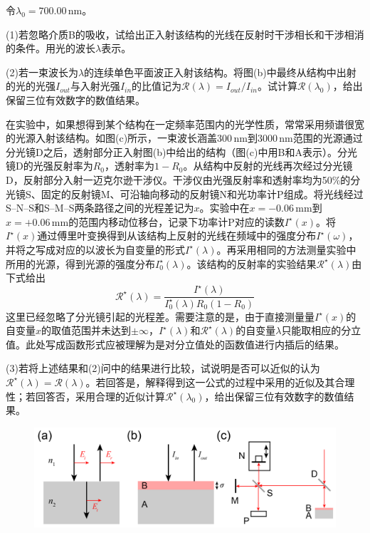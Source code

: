 \documentclass[11pt,a4paper,onecolumn,UTF8]{ctexart}
\begin{document}
	令$\lambda_0=700.00\,\text{nm}$。
	
	(1)若忽略介质B的吸收，试给出正入射该结构的光线在反射时干涉相长和干涉相消的条件。用光的波长$\lambda$表示。
	
	(2)若一束波长为$\lambda$的连续单色平面波正入射该结构。将图(b)中最终从结构中出射的光的光强$I_{out}$与入射光强$I_{in}$的比值记为$\mathscr{R}(\lambda)=I_{out}/I_{in}$。试计算$\mathscr{R}(\lambda_0)$，给出保留三位有效数字的数值结果。
	
	在实验中，如果想得到某个结构在一定频率范围内的光学性质，常常采用频谱很宽的光源入射该结构。如图(c)所示，一束波长涵盖$300\,\text{nm}$到$3000\,\text{nm}$范围的光源通过分光镜D之后，透射部分正入射图(b)中给出的结构（图(c)中用B和A表示）。分光镜D的光强反射率为$R_0$，透射率为$1-R_0$。从结构中反射的光线再次经过分光镜D，反射部分入射一迈克尔逊干涉仪。干涉仪由光强反射率和透射率均为50\%的分光镜S、固定的反射镜M、可沿轴向移动的反射镜N和光功率计P组成。将光线经过S--N--S和S--M--S两条路径之间的光程差记为$x$。实验中在$x=-0.06\,\text{mm}$到$x=+0.06\,\text{mm}$的范围内移动位移台，记录下功率计P对应的读数$I^{\star}(x)$。将$I^{\star}(x)$通过傅里叶变换得到从该结构上反射的光线在频域中的强度分布$I^{\star}(\omega)$，并将之写成对应的以波长为自变量的形式$I^{\star}(\lambda)$。再采用相同的方法测量实验中所用的光源，得到光源的强度分布$I_0^{\star}(\lambda)$。该结构的反射率的实验结果$\mathscr{R}^{\star}(\lambda)$由下式给出
	\begin{equation*}
		\mathscr{R}^{\star}(\lambda)=\frac{I^{\star}(\lambda)}{I_0^{\star}(\lambda)R_0(1-R_0)}
	\end{equation*}
	这里已经忽略了分光镜引起的光程差。需要注意的是，由于直接测量量$I^{\star}(x)$的自变量$x$的取值范围并未达到$\pm\infty$，$I^{\star}(\lambda)$和$\mathscr{R}^{\star}(\lambda)$的自变量$\lambda$只能取相应的分立值。此处写成函数形式应被理解为是对分立值处的函数值进行内插后的结果。
	
	(3)若将上述结果和(2)问中的结果进行比较，试说明是否可以近似的认为$\mathscr{R}^{\star}(\lambda)=\mathscr{R}(\lambda)$。若回答是，解释得到这一公式的过程中采用的近似及其合理性；若回答否，采用合理的近似计算$\mathscr{R}^{\star}(\lambda_0)$，给出保留三位有效数字的数值结果。
	
	\begin{figure}[!bh]
		\centering
		\includegraphics[width=0.95\columnwidth]{5.png}
	\end{figure}
	
\end{document}
